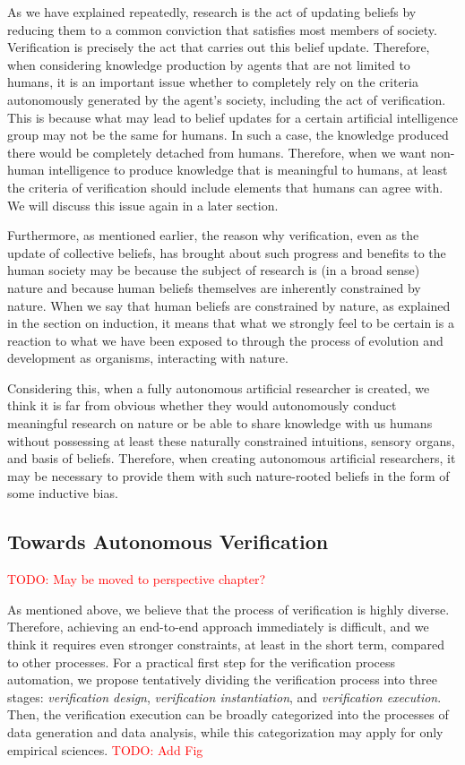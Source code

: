 \documentclass{book}
\begin{document}
As we have explained repeatedly, research is the act of updating beliefs by reducing them to a common conviction that satisfies most members of society. Verification is precisely the act that carries out this belief update. Therefore, when considering knowledge production by agents that are not limited to humans, it is an important issue whether to completely rely on the criteria autonomously generated by the agent's society, including the act of verification. This is because what may lead to belief updates for a certain artificial intelligence group may not be the same for humans. In such a case, the knowledge produced there would be completely detached from humans. Therefore, when we want non-human intelligence to produce knowledge that is meaningful to humans, at least the criteria of verification should include elements that humans can agree with. We will discuss this issue again in a later section.

Furthermore, as mentioned earlier, the reason why verification, even as the update of collective beliefs, has brought about such progress and benefits to the human society may be because the subject of research is (in a broad sense) nature and because human beliefs themselves are inherently constrained by nature. When we say that human beliefs are constrained by nature, as explained in the section on induction, it means that what we strongly feel to be certain is a reaction to what we have been exposed to through the process of evolution and development as organisms, interacting with nature.

Considering this, when a fully autonomous artificial researcher is created, we think it is far from obvious whether they would autonomously conduct meaningful research on nature or be able to share knowledge with us humans without possessing at least these naturally constrained intuitions, sensory organs, and basis of beliefs. Therefore, when creating autonomous artificial researchers, it may be necessary to provide them with such nature-rooted beliefs in the form of some inductive bias.

\subsection{Towards Autonomous Verification}
\textcolor{red}{TODO: May be moved to perspective chapter?}

As mentioned above, we believe that the process of verification is highly diverse. Therefore, achieving an end-to-end approach immediately is difficult, and we think it requires even stronger constraints, at least in the short term, compared to other processes. For a practical first step for the verification process automation, we propose tentatively dividing the verification process into three stages: \textit{verification design}, \textit{verification instantiation}, and \textit{verification execution}. Then, the verification execution can be broadly categorized into the processes of data generation and data analysis, while this categorization may apply for only empirical sciences. \textcolor{red}{TODO: Add Fig}
\end{document}
